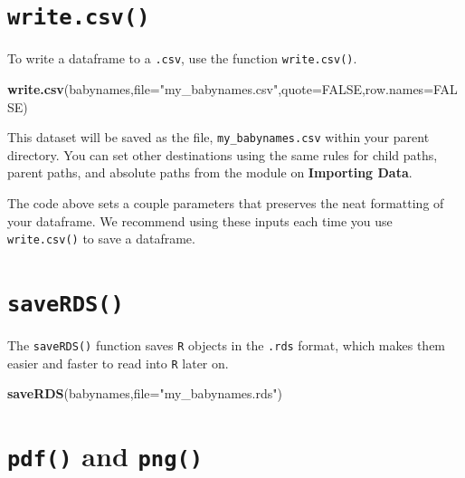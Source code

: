 \documentclass[
]{book}
\newenvironment{Shaded}{\begin{snugshade}}{\end{snugshade}}
\newcommand{\DataTypeTok}[1]{\textcolor[rgb]{0.13,0.29,0.53}{#1}}
\newcommand{\KeywordTok}[1]{\textcolor[rgb]{0.13,0.29,0.53}{\textbf{#1}}}
\newcommand{\NormalTok}[1]{#1}
\newcommand{\OtherTok}[1]{\textcolor[rgb]{0.56,0.35,0.01}{#1}}
\newcommand{\StringTok}[1]{\textcolor[rgb]{0.31,0.60,0.02}{#1}}
\begin{document}
\hypertarget{write.csv}{%
\section*{\texorpdfstring{\texttt{write.csv()}}{write.csv()}}\label{write.csv}}

To write a dataframe to a \texttt{.csv}, use the function \texttt{write.csv()}.

\begin{Shaded}
\begin{Highlighting}[]
\KeywordTok{write.csv}\NormalTok{(babynames,}\DataTypeTok{file=}\StringTok{"my_babynames.csv"}\NormalTok{,}\DataTypeTok{quote=}\OtherTok{FALSE}\NormalTok{,}\DataTypeTok{row.names=}\OtherTok{FALSE}\NormalTok{)}
\end{Highlighting}
\end{Shaded}

This dataset will be saved as the file, \texttt{my\_babynames.csv} within your parent directory. You can set other destinations using the same rules for child paths, parent paths, and absolute paths from the module on \textbf{Importing Data}.

The code above sets a couple parameters that preserves the neat formatting of your dataframe. We recommend using these inputs each time you use \texttt{write.csv()} to save a dataframe.

\hypertarget{saverds}{%
\section*{\texorpdfstring{\texttt{saveRDS()}}{saveRDS()}}\label{saverds}}

The \texttt{saveRDS()} function saves \texttt{R} objects in the \texttt{.rds} format, which makes them easier and faster to read into \texttt{R} later on.

\begin{Shaded}
\begin{Highlighting}[]
\KeywordTok{saveRDS}\NormalTok{(babynames,}\DataTypeTok{file=}\StringTok{"my_babynames.rds"}\NormalTok{)}
\end{Highlighting}
\end{Shaded}

\hypertarget{pdf-and-png}{%
\section*{\texorpdfstring{\texttt{pdf()} and \texttt{png()}}{pdf() and png()}}\label{pdf-and-png}}
\end{document}
